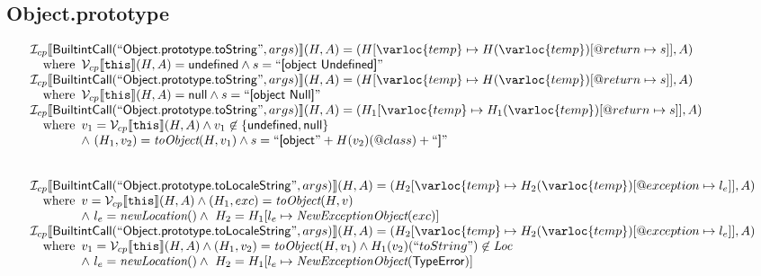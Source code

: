 \subsection{Object.prototype}
\[
\begin{array}{l}
\I _{cp}\lbr \SF{BuiltintCall}(``\SF{Object.prototype.toString}",args)\rbr(H,A)
 = (H[\varloc{temp}\mapsto H(\varloc{temp})[\varprop{return}\mapsto s]], A) \\
\quad\wherec{
  \V _{cp}\lbr \TT{this}\rbr (H,A) = \SF{undefined} \land s =  ``\SF{[object Undefined]}"
  }\\
  
\I _{cp}\lbr \SF{BuiltintCall}(``\SF{Object.prototype.toString}",args)\rbr(H,A)
 = (H[\varloc{temp}\mapsto H(\varloc{temp})[\varprop{return}\mapsto s]], A) \\
\quad\wherec{
  \V _{cp}\lbr \TT{this}\rbr (H,A) = \SF{null} \land s =  ``\SF{[object Null]}"
  }\\
  
\I _{cp}\lbr \SF{BuiltintCall}(``\SF{Object.prototype.toString}",args)\rbr(H,A)
 = (H_1[\varloc{temp}\mapsto H_1(\varloc{temp})[\varprop{return}\mapsto s]], A) \\
\quad\wherec{
  v_1 = \V _{cp}\lbr \TT{this}\rbr (H,A) \land  v_1 \not\in \{ \SF{undefined}, \SF{null} \}\\
  \land\ (H_1, v_2) = \hf{toObject}(H, v_1) \land s =  ``\SF{[object}" + H(v_2)(@class) + ``\SF{]}"
  }\\
\\\\



\I _{cp}\lbr \SF{BuiltintCall}(``\SF{Object.prototype.toLocaleString}",args)\rbr(H,A)
 = (H_2[\varloc{temp}\mapsto H_2(\varloc{temp})[\varprop{exception}\mapsto l_e]], A) \\
\quad\wherec{
  v = \V _{cp}\lbr \TT{this}\rbr (H,A) \land (H_1, exc) = \hf{toObject}(H, v)\\
  \land\ l_e = \hf{newLocation}() \land\ H_2=H_1[l_e\mapsto\hf{NewExceptionObject}(exc)] 
  }\\
  
\I _{cp}\lbr \SF{BuiltintCall}(``\SF{Object.prototype.toLocaleString}",args)\rbr(H,A)
 = (H_2[\varloc{temp}\mapsto H_2(\varloc{temp})[\varprop{exception}\mapsto l_e]], A) \\
\quad\wherec{
  v_1 = \V _{cp}\lbr \TT{this}\rbr (H,A) \land (H_1, v_2) = \hf{toObject}(H, v_1) \land H_1(v_2)(``toString") \not\in \Loc\\
  \land\ l_e = \hf{newLocation}() \land\ H_2=H_1[l_e\mapsto\hf{NewExceptionObject}(\SF{TypeError})]
  }\\
  

\end{array}\]
